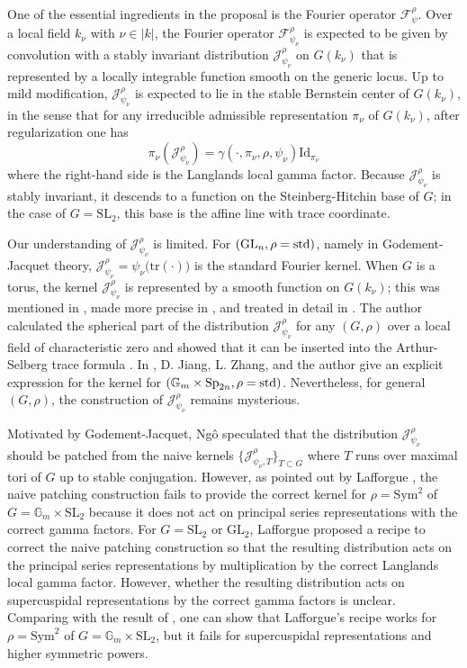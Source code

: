 \documentclass[iccmp]{ipbook}
\newcommand{\BG}{{\mathbb {G}}}
\newcommand{\CF}{{\mathcal {F}}}
\newcommand{\CJ}{{\mathcal {J}}}
\newcommand{\GL}{{\mathrm{GL}}}
\newcommand{\Id}{{\mathrm{Id}}}
\newcommand{\SL}{{\mathrm{SL}}}
\newcommand{\Sym}{{\mathrm{Sym}}}
\newcommand{\Sp}{{\mathrm{Sp}}}
\newcommand{\tr}{{\mathrm{tr}}}
\def\std{\rm std}
\def\gam{{\gamma}}
\begin{document}
One of the essential ingredients in the proposal is the Fourier operator $\CF^\rho_\psi$. Over a local field $k_\nu$ with $\nu\in |k|$, the Fourier operator $\CF^\rho_{\psi_\nu}$ is expected to be given by
convolution with a stably invariant distribution $\CJ^\rho_{\psi_\nu}$ on $G(k_\nu)$ that is represented by a locally integrable function smooth on the generic locus.
Up to mild modification, $\CJ^\rho_{\psi_\nu}$ is expected to lie in the stable Bernstein center of $G(k_\nu)$, in the sense that for any irreducible admissible representation $\pi_\nu$ of $G(k_\nu)$,
after regularization one has
$$
\pi_\nu(\CJ^\rho_{\psi_\nu}) = \gam(\cdot,\pi_\nu,\rho,\psi_\nu)\Id_{\pi_\nu}
$$
where the right-hand side is the Langlands local gamma factor. Because $\CJ^\rho_{\psi_\nu}$
is stably invariant, it descends to a function on the Steinberg-Hitchin base of $G$; in the case of $G=\SL_2$, this base is the
affine line with trace coordinate.

Our understanding of $\CJ^\rho_{\psi_\nu}$ is limited. For $(\GL_n,\rho=\std)$,
namely in Godement-Jacquet theory, $\CJ^\rho_{\psi_\nu} = \psi_\nu\big(\tr(\cdot)\big)$ is the standard
Fourier kernel. When $G$ is a torus, the kernel $\CJ^\rho_{\psi_\nu}$ is represented by
a smooth function on $G(k_\nu)$; this was mentioned in \cite{BK00}, made more precise in
\cite{ngo2016hankel}, and treated in detail in \cite{LN}. The author calculated the
spherical part of the distribution $\CJ^\rho_{\psi_\nu}$ for any $(G,\rho)$ over a local field 
of characteristic zero and showed that it can be inserted into the Arthur-Selberg trace formula \cite{MR3990815}.
In \cite{JLZ}, D. Jiang, L. Zhang, and the author give an explicit expression for the kernel for
$(\BG_m\times \Sp_{2n},\rho=\std)$. 
Nevertheless, for general $(G,\rho)$, the construction of $\CJ^\rho_{\psi_\nu}$ remains mysterious.

Motivated by Godement-Jacquet, Ng\^o speculated that the distribution $\CJ^\rho_{\psi_\nu}$
should be patched from the naive kernels $\{\CJ^\rho_{\psi_\nu,T}\}_{T\subset G}$ where 
$T$ runs over maximal tori of $G$ up to stable conjugation. However, as pointed out by 
Lafforgue \cite{lafforguegl2}, the naive patching construction fails to provide the correct kernel for $\rho=\Sym^2$ of $G=\BG_m\times \SL_2$
because it does not act on principal series representations with the correct gamma factors. For $G=\SL_2$ or $\GL_2$, Lafforgue proposed a recipe
to correct the naive patching construction so that the resulting distribution acts on the principal series representations by multiplication 
by the correct Langlands local gamma factor. However, whether the resulting distribution acts on supercuspidal representations by the correct gamma factors 
is unclear. Comparing with the result of \cite{JLZ}, one can show that Lafforgue's recipe works for $\rho=\Sym^2$ of $G=\BG_m\times \SL_2$, but it fails for supercuspidal representations and
higher symmetric powers. 
\end{document}
